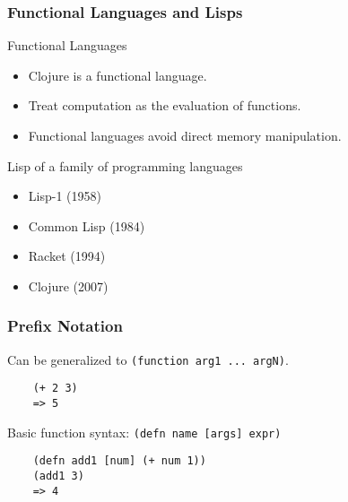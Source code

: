 \documentclass{beamer}
\newcommand{\clocode}[1]{{\texttt {#1}}}
\begin{document}
\begin{frame}[fragile]
\frametitle{Functional Languages and Lisps}
	Functional Languages
	\begin{itemize}
	 \item Clojure is a functional language.
  	 \item Treat computation as the evaluation of functions.
  	 \item Functional languages avoid direct memory manipulation.
       \end{itemize}
	Lisp of a family of programming languages 
		\begin{itemize}
		 \item Lisp-1 (1958)

		 \item Common Lisp (1984)
		 \item Racket (1994)
		 \item Clojure	(2007)
		\end{itemize}
\end{frame}
\begin{frame}[fragile]
\frametitle{Prefix Notation}
Can be generalized to \clocode{(function arg1 ... argN)}.
	\begin{verbatim}
	(+ 2 3)
	=> 5
	\end{verbatim}
Basic function syntax: \clocode{(defn name [args] expr)}
	\begin{verbatim}
	(defn add1 [num] (+ num 1))
	(add1 3)
	=> 4
	\end{verbatim}
\end{frame}
\end{document}

